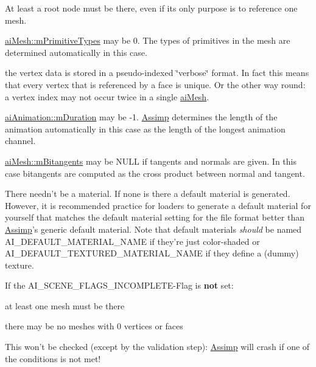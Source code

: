 \begin{DoxyItemize}
\item At least a root node must be there, even if its only purpose is to reference one mesh. 
\item \hyperlink{structai_mesh_a99d66ac0a444068c1b252b30265cbf53}{ai\+Mesh\+::m\+Primitive\+Types} may be 0. The types of primitives in the mesh are determined automatically in this case. 
\item the vertex data is stored in a pseudo-\/indexed \char`\"{}verbose\char`\"{} format. In fact this means that every vertex that is referenced by a face is unique. Or the other way round\+: a vertex index may not occur twice in a single \hyperlink{structai_mesh}{ai\+Mesh}. 
\item \hyperlink{structai_animation_ae2bbc49320b4b75c05e23e0ab704ece7}{ai\+Animation\+::m\+Duration} may be -\/1. \hyperlink{class_assimp}{Assimp} determines the length of the animation automatically in this case as the length of the longest animation channel. 
\item \hyperlink{structai_mesh_ab2a81bfe1731f01271ebab274a8f01c4}{ai\+Mesh\+::m\+Bitangents} may be N\+U\+L\+L if tangents and normals are given. In this case bitangents are computed as the cross product between normal and tangent. 
\item There needn't be a material. If none is there a default material is generated. However, it is recommended practice for loaders to generate a default material for yourself that matches the default material setting for the file format better than \hyperlink{class_assimp}{Assimp}'s generic default material. Note that default materials {\itshape should} be named A\+I\+\_\+\+D\+E\+F\+A\+U\+L\+T\+\_\+\+M\+A\+T\+E\+R\+I\+A\+L\+\_\+\+N\+A\+M\+E if they're just color-\/shaded or A\+I\+\_\+\+D\+E\+F\+A\+U\+L\+T\+\_\+\+T\+E\+X\+T\+U\+R\+E\+D\+\_\+\+M\+A\+T\+E\+R\+I\+A\+L\+\_\+\+N\+A\+M\+E if they define a (dummy) texture.  
\end{DoxyItemize}If the A\+I\+\_\+\+S\+C\+E\+N\+E\+\_\+\+F\+L\+A\+G\+S\+\_\+\+I\+N\+C\+O\+M\+P\+L\+E\+T\+E-\/\+Flag is {\bfseries not} set\+:
\begin{DoxyItemize}
\item at least one mesh must be there 
\item there may be no meshes with 0 vertices or faces 
\end{DoxyItemize}This won't be checked (except by the validation step)\+: \hyperlink{class_assimp}{Assimp} will crash if one of the conditions is not met!


